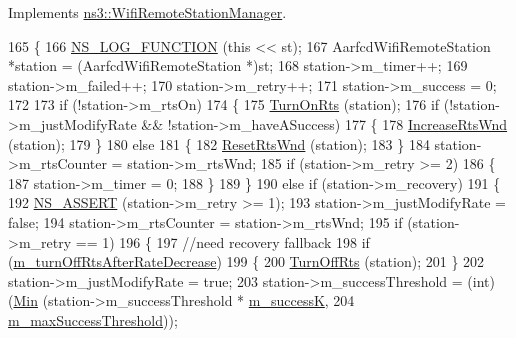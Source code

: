 Implements \hyperlink{classns3_1_1WifiRemoteStationManager_a38a4401b6232cb547f5a85337e02b12c}{ns3\+::\+Wifi\+Remote\+Station\+Manager}.


\begin{DoxyCode}
165 \{
166   \hyperlink{log-macros-disabled_8h_a90b90d5bad1f39cb1b64923ea94c0761}{NS\_LOG\_FUNCTION} (\textcolor{keyword}{this} << st);
167   AarfcdWifiRemoteStation *station = (AarfcdWifiRemoteStation *)st;
168   station->m\_timer++;
169   station->m\_failed++;
170   station->m\_retry++;
171   station->m\_success = 0;
172 
173   \textcolor{keywordflow}{if} (!station->m\_rtsOn)
174     \{
175       \hyperlink{classns3_1_1AarfcdWifiManager_a7c0735a4d35702f34551d000808d9875}{TurnOnRts} (station);
176       \textcolor{keywordflow}{if} (!station->m\_justModifyRate && !station->m\_haveASuccess)
177         \{
178           \hyperlink{classns3_1_1AarfcdWifiManager_afb01eeaa098032d4b0433a75e72de71d}{IncreaseRtsWnd} (station);
179         \}
180       \textcolor{keywordflow}{else}
181         \{
182           \hyperlink{classns3_1_1AarfcdWifiManager_a058177eefb3e0938db7a6dae911d4f1b}{ResetRtsWnd} (station);
183         \}
184       station->m\_rtsCounter = station->m\_rtsWnd;
185       \textcolor{keywordflow}{if} (station->m\_retry >= 2)
186         \{
187           station->m\_timer = 0;
188         \}
189     \}
190   \textcolor{keywordflow}{else} \textcolor{keywordflow}{if} (station->m\_recovery)
191     \{
192       \hyperlink{assert_8h_a6dccdb0de9b252f60088ce281c49d052}{NS\_ASSERT} (station->m\_retry >= 1);
193       station->m\_justModifyRate = \textcolor{keyword}{false};
194       station->m\_rtsCounter = station->m\_rtsWnd;
195       \textcolor{keywordflow}{if} (station->m\_retry == 1)
196         \{
197           \textcolor{comment}{//need recovery fallback}
198           \textcolor{keywordflow}{if} (\hyperlink{classns3_1_1AarfcdWifiManager_a5ebefecf767771e0d858de09fdb5c264}{m\_turnOffRtsAfterRateDecrease})
199             \{
200               \hyperlink{classns3_1_1AarfcdWifiManager_a6d7efd473f4ea360b0f95895d91e5e1e}{TurnOffRts} (station);
201             \}
202           station->m\_justModifyRate = \textcolor{keyword}{true};
203           station->m\_successThreshold = (int)(\hyperlink{group__highprec_gacb0b89d5f4363bf77747ff1212f27430}{Min} (station->m\_successThreshold * 
      \hyperlink{classns3_1_1AarfcdWifiManager_a6f0c73ae231af0375391ab04e63cf0b2}{m\_successK},
204                                                    \hyperlink{classns3_1_1AarfcdWifiManager_a2356178ccd0f0666b94437e1adb33064}{m\_maxSuccessThreshold}));

\end{DoxyCode}
